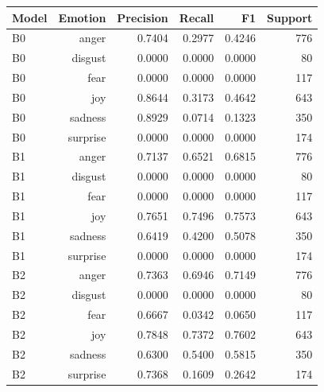 \begin{tabular}{lrrrrr}
\toprule
Model & Emotion & Precision & Recall & F1 & Support \\
\midrule
B0 & anger & 0.7404 & 0.2977 & 0.4246 & 776 \\
B0 & disgust & 0.0000 & 0.0000 & 0.0000 & 80 \\
B0 & fear & 0.0000 & 0.0000 & 0.0000 & 117 \\
B0 & joy & 0.8644 & 0.3173 & 0.4642 & 643 \\
B0 & sadness & 0.8929 & 0.0714 & 0.1323 & 350 \\
B0 & surprise & 0.0000 & 0.0000 & 0.0000 & 174 \\
B1 & anger & 0.7137 & 0.6521 & 0.6815 & 776 \\
B1 & disgust & 0.0000 & 0.0000 & 0.0000 & 80 \\
B1 & fear & 0.0000 & 0.0000 & 0.0000 & 117 \\
B1 & joy & 0.7651 & 0.7496 & 0.7573 & 643 \\
B1 & sadness & 0.6419 & 0.4200 & 0.5078 & 350 \\
B1 & surprise & 0.0000 & 0.0000 & 0.0000 & 174 \\
B2 & anger & 0.7363 & 0.6946 & 0.7149 & 776 \\
B2 & disgust & 0.0000 & 0.0000 & 0.0000 & 80 \\
B2 & fear & 0.6667 & 0.0342 & 0.0650 & 117 \\
B2 & joy & 0.7848 & 0.7372 & 0.7602 & 643 \\
B2 & sadness & 0.6300 & 0.5400 & 0.5815 & 350 \\
B2 & surprise & 0.7368 & 0.1609 & 0.2642 & 174 \\
\bottomrule
\end{tabular}
